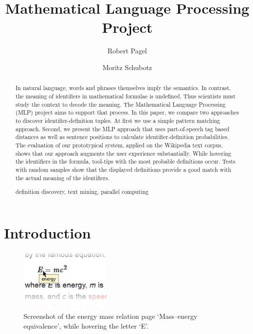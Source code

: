 \documentclass[runningheads]{llncs}
\newcommand{\keywords}[1]{\par\addvspace\baselineskip
\noindent\keywordname\enspace\ignorespaces#1}
\begin{document}
\mainmatter

\title{Mathematical Language Processing \\ Project}

\author{Robert Pagel \and Moritz Schubotz}



\maketitle


\begin{abstract}

In natural language, words and phrases themselves imply the semantics. In
contrast, the meaning of identifiers in mathematical formulae is undefined.
Thus scientists must study the context to decode the meaning. The Mathematical
Language Processing (MLP) project aims to support that process. In this
paper, we compare two approaches to discover identifier-definition tuples. At
first we use a simple pattern matching approach. Second, we present the MLP
approach that uses part-of-speech tag based distances as well as sentence
positions to calculate identifier-definition probabilities. The evaluation of
our prototypical system, applied on the Wikipedia text corpus, shows that our
approach augments the user experience substantially. While hovering the
identifiers in the formula, tool-tips with the most probable definitions
occur. Tests with random samples show that the displayed definitions provide a
good match with the actual meaning of the identifiers.


\keywords{definition discovery, text mining, parallel computing}
\end{abstract}


\section{Introduction}

\begin{figure}
\label{fig:screenshot}
\vspace{-20pt}
	\includegraphics[width=0.4\textwidth]{screenshot}
\caption{Screenshot of the energy mass relation page `Mass–energy equivalence', while hovering the letter `E'.}
\vspace{-20pt}
\end{figure}
\end{document}
